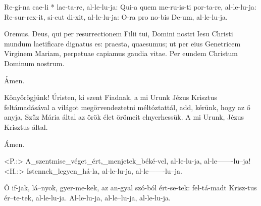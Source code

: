 \documentclass[twoside]{article}
\begin{document}


\begin{gregosheet}
            {   Re-gi-na cae-li * lae-ta-re, al-le-lu-ja: Qui-a quem me-ru-is-ti por-ta-re, al-le-lu-ja: Re-sur-rex-it, si-cut di-xit, al-le-lu-ja: O-ra pro no-bis De-um, al-le-lu-ja.}
\end{gregosheet}


\p Oremus. Deus, qui per resurrectionem Filii tui, Domini nostri Iesu Christi mundum laetificare
dignatus es: praesta, quaesumus; ut per eius Genetricem Virginem Mariam, perpetuae capiamus gaudia
vitae. Per eundem Christum Dominum nostrum.

\h Amen.



\p Könyörögjünk! Úristen, ki szent Fiadnak, a mi Urunk Jézus Krisztus feltámadásával a világot
megörvendeztetni méltóztattál, add, kérünk, hogy az ő anyja, Szűz Mária által az örök élet örömeit
elnyerhessük. A mi Urunk, Jézus Krisztus által.

\h Ámen.


\begin{gregosheet}
            {  <P.:> A_szentmise_véget_ért,_menjetek_béké-vel, al-le-lu-ja, al-le-------lu--ja!   <H.:> Istennek_legyen_há-la, al-le-lu-ja, al-le-------lu--ja.}
\end{gregosheet}


\begin{gregosheet}
            {   Ó if-jak, lá--nyok, gyer-me-kek, az an-gyal szó-ból ért-se-tek: fel-tá-madt Krisz-tus ér--te-tek, al-le-lu-ja. Al-le-lu-ja, al-le--lu-ja, al-le-lu-ja.}
\end{gregosheet}
\end{document}
